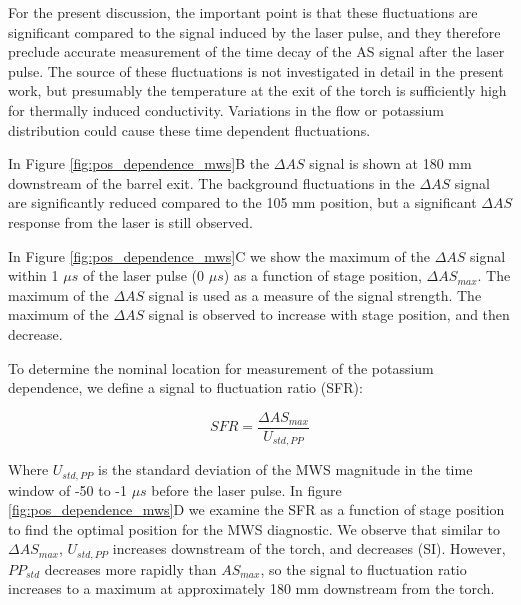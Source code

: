 For the present discussion, the important point is that these fluctuations are significant compared to the signal induced by the laser pulse, and they therefore preclude accurate measurement of the time decay of the AS signal after the laser pulse. The source of these fluctuations is not investigated in detail in the present work, but presumably the temperature at the exit of the torch is sufficiently high for thermally induced conductivity. Variations in the flow or potassium distribution could cause these time dependent fluctuations. 

In Figure \ref{fig:pos_dependence_mws}B the $\Delta AS$ signal is shown at 180 mm downstream of the barrel exit. The background fluctuations in the $\Delta AS$ signal are significantly reduced compared to the 105 mm position, but a significant $\Delta AS$ response from the laser is still observed. 

In Figure \ref{fig:pos_dependence_mws}C we show the maximum of the $\Delta AS$ signal within 1 $\mu s$ of the laser pulse (0 $\mu s$) as a function of stage position, $\Delta AS_{max}$. The maximum of the $\Delta AS$ signal is used as a measure of the signal strength. The maximum of the $\Delta AS$ signal is observed to increase with stage position, and then decrease.


To determine the nominal location for measurement of the potassium dependence, we define a signal to fluctuation ratio (SFR): 

\begin{equation}
    \label{eq:sfr}
    SFR = \frac{\Delta AS_{max}}{U_{std,PP}}
\end{equation}

Where $U_{std,PP}$ is the standard deviation of the MWS magnitude in the time window of -50 to -1 $\mu s$ before the laser pulse.  In figure \ref{fig:pos_dependence_mws}D we examine the SFR as a function of stage position to find the optimal position for the MWS diagnostic. We observe that similar to $\Delta AS_{max}$, $U_{std,PP}$ increases downstream of the torch, and decreases (SI). However, $PP_{std}$ decreases more rapidly than $AS_{max}$, so the signal to fluctuation ratio increases to a maximum at approximately 180 mm downstream from the torch. 


